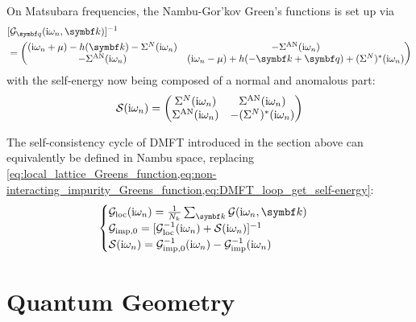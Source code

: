 \documentclass[../main.tex]{subfiles}
\begin{document}
On Matsubara frequencies, the Nambu-Gor'kov Green's functions is set up via
\begin{align}
	&[\mathcal{G}_{\vb{q}} (\iu \omega_n, \vb{k})]^{-1} \\
	&= \begin{pmatrix}
		(\iu \omega_n + \mu) - h (\vb{k}) - \Sigma^{N} (\iu \omega_n) & -\Sigma^{\mathrm{AN}} (\iu \omega_n) \\
		-\Sigma^{\mathrm{AN}} (\iu \omega_n) & (\iu \omega_n - \mu) + h (-\vb{k} + \vb{q}) + (\Sigma^{N})^* (\iu \omega_n) \nonumber
	\end{pmatrix}
\end{align}
with the self-energy now being composed of a normal and anomalous part:
\begin{align}
	\mathcal{S} (\mathrm{i} \omega_n) = 
	\begin{pmatrix}
		\Sigma^{N} (\mathrm{i} \omega_n) & \Sigma^{\mathrm{AN}} (\mathrm{i} \omega_n) \\
		\Sigma^{\mathrm{AN}} (\mathrm{i} \omega_n) & -(\Sigma^{N})^* (\mathrm{i} \omega_n)
	\end{pmatrix}
\end{align}

The self-consistency cycle of DMFT introduced in the section above can equivalently be defined in Nambu space, replacing \cref{eq:local_lattice_Greens_function,eq:non-interacting_impurity_Greens_function,eq:DMFT_loop_get_self-energy}:
\begin{align}
	\begin{cases}
		\mathcal{G}_{\mathrm{loc}} (\iu \omega_n) = \frac{1}{N_k} \sum_{\vb{k}} \mathcal{G} (\iu \omega_n, \vb{k}) \\
		\mathcal{G}_{\mathrm{imp}, 0} = [\mathcal{G}_{\mathrm{loc}}^{-1} (\iu \omega_n) + \mathcal{S} (\iu \omega_n)]^{-1} \\
		\mathcal{S} (\iu \omega_n) = \mathcal{G}_{\mathrm{imp}, 0}^{-1} (\iu \omega_n) - \mathcal{G}_{\mathrm{imp}}^{-1} (\iu \omega_n)
	\end{cases}
\end{align}

\section{Quantum Geometry}\label{sec:quantum-metric}
\end{document}
